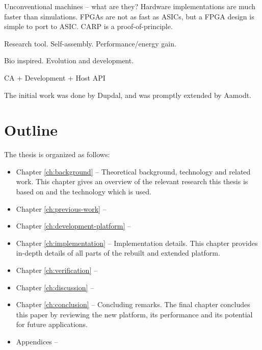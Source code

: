 \TODO
Unconventional machines – what are they?
Hardware implementations are much faster than simulations.
FPGAs are not as fast as ASICs, but a FPGA design is simple to port to ASIC.
CARP is a proof-of-principle.

Research tool.
Self-assembly.
Performance/energy gain.

Bio inspired.
Evolution and development.

CA + Development + Host API


The initial work was done by Dupdal, and was promptly extended by Aamodt.

\section{Outline}

\TODO
The thesis is organized as follows:

\begin{itemize}
    \item Chapter \ref{ch:background} –
        Theoretical background, technology and related work.
        This chapter gives an overview of the relevant research this thesis is based on and the technology which is used.
    \item Chapter \ref{ch:previous-work} –
        \TODO
    \item Chapter \ref{ch:development-platform} –
        \TODO
    \item Chapter \ref{ch:implementation} –
        Implementation details.
        This chapter provides in-depth details of all parts of the rebuilt and extended platform.
        \TODO
    \item Chapter \ref{ch:verification} –
        \TODO
    \item Chapter \ref{ch:discussion} –
        \TODO
    \item Chapter \ref{ch:conclusion} –
        Concluding remarks.
        The final chapter concludes this paper by reviewing the new platform, its performance and its potential for future applications.
    \item Appendices –
        \TODO
\end{itemize}
